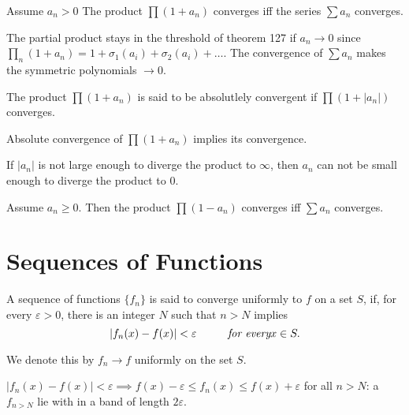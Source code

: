 \documentclass[10pt,a4paper]{book}
\begin{document}
\begin{Thm}
Assume $a_n >0$ The product $\prod (1+a_n) $ converges iff the series $\sum a_n$ converges.
\end{Thm}
\PP The partial product stays in the threshold of theorem 127 if $a_n \rightarrow 0$ since $\prod_n (1+a_n) =  1 + \sigma_1(a_i) + \sigma_2(a_i) + \dots.$ The convergence of $\sum a_n$ makes the symmetric polynomials $\rightarrow 0.$


\begin{deff}
The product $\prod (1+a_n)$ is said to be absolutlely convergent if $\prod (1+ |a_n|)$ converges.
\end{deff}
\begin{Thm}
Absolute convergence of $\prod (1+a_n)$ implies its convergence.
\end{Thm}
\PP If $|a_n|$ is not large enough to diverge the product to $\infty$, then $a_n$ can not be small enough to diverge the product to $0$.
\begin{Thm}
Assume $a_n \geq 0.$ Then the product $\prod (1-a_n)$ converges iff $\sum a_n$ converges.
\end{Thm}

\chapter{Sequences of Functions}
\begin{deff}
A sequence of functions $\{f_n\}$ is said to converge uniformly to $f$ on a set $S$, if, for every $\varepsilon >0$, there is an integer $N$ such that $n > N$ implies
$$|f_n(x) - f(x)| < \varepsilon \sp \textit{for every} x \in S.$$

We denote this by $f_n \rightarrow f$ uniformly on the set $S$.
\end{deff}
\PP $|f_n(x) - f(x)| < \varepsilon \implies f(x) - \varepsilon \leq f_n(x) \leq f(x) + \varepsilon$ for all $n >N$: a $f_{n>N}$ lie with in a band of length $2\varepsilon.$
\newcommand{\fuc}{Assume $f_n \rightarrow f$ uniformly on $S.$ }
\end{document}
